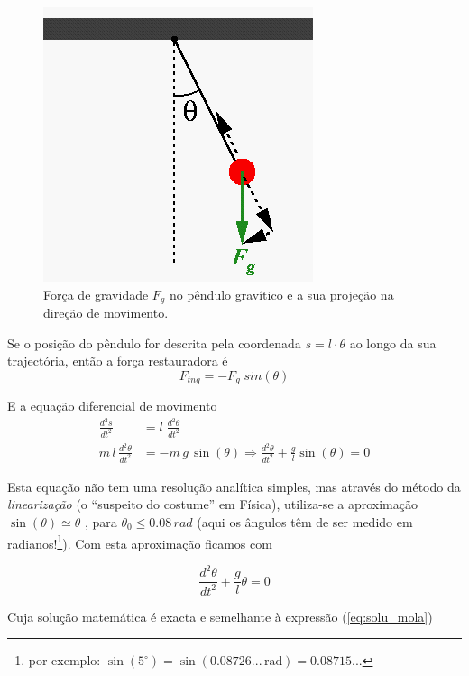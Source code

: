 \documentclass[a4paper,twoside,12pt]{article}      %
\begin{document}
\begin{figure}
	[!htbp] \centering 
	
	\includegraphics[width=0.5	\textwidth]{forcespend} \caption{Força de gravidade $F_g$ no pêndulo gravítico e a sua projeção na direção de movimento. \label{fig:3} } 
\end{figure}

Se o posição do pêndulo for descrita pela coordenada $s= l\cdot \theta$ ao longo da sua trajectória, 
então a força restauradora é 
\begin{equation}
	\label{eq:4} 
F_{tng} = - F_{g} \; sin(\theta) 
\end{equation}

E a equação diferencial de movimento 
\begin{align}
	\label{eq:5} 
	\frac{d^2 s}{dt^2} &=  l\;  \frac{d^2 \theta}{dt^2} \nonumber \\
	m \, l \, \frac{d^2 \theta}{dt^2} &= - m \,  g \, \sin(\theta)  \Rightarrow \frac{d^2 \theta}{dt^2} + \frac{g}{l} \sin(\theta) = 0
\end{align}

Esta equação não tem uma resolução analítica simples, mas através do método  da \emph{linearização} (o ``suspeito do costume''  em Física), utiliza-se a aproximação $ \sin(\theta) \simeq \theta$ , para  $\theta_0 \le 0.08\,rad$ (aqui  os ângulos têm de ser medido em radianos!\footnote{ por exemplo: $\sin(5 ^{\circ}) = \sin(0.08726... \, \text{rad}) = 0.08715... $}).
Com esta aproximação ficamos com 

\begin{equation}
	\label{eq:6} 
	 \frac{d^2 \theta}{dt^2} + \frac{g}{l} \theta =0
\end{equation}

Cuja solução matemática é exacta e semelhante à expressão (\ref{eq:solu_mola})
\end{document}
